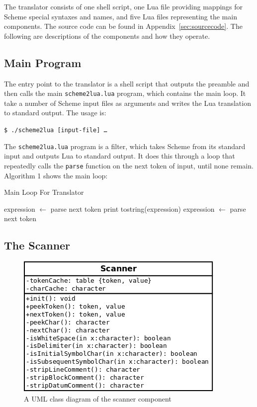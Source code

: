 The translator consists of one shell script, one Lua file providing mappings for
Scheme special syntaxes and names, and five Lua files representing the main
components. The source code can be found in Appendix~\ref{sec:sourcecode}. The
following are descriptions of the components and how they operate.

\subsection{Main Program}

The entry point to the translator is a shell script that outputs the preamble
and then calls the main \texttt{scheme2lua.lua} program, which contains the main
loop. It take a number of Scheme input files as arguments and writes the Lua
translation to standard output. The usage is:

\begin{framed}
\texttt{\$ ./scheme2lua [input-file] \ldots}
\end{framed}

The \texttt{scheme2lua.lua} program is a filter, which takes Scheme from its
standard input and outputs Lua to standard output. It does this through a loop
that repeatedly calls the \texttt{parse} function on the next token of input,
until none remain. Algorithm 1 shows the main loop:

\begin{algorithm}
\caption{Main Loop For Translator}
\label{alg:mainloop}
\begin{algorithmic}
\STATE expression $\leftarrow$ parse next token  
\STATE print tostring(expression)
\STATE expression $\leftarrow$ parse next token
\ENDWHILE
\end{algorithmic}
\end{algorithm}

\subsection{The Scanner}

\begin{figure}
\centering
\includegraphics[width=\textwidth]{scannerUML.png}
\caption{A UML class diagram of the scanner component}
\label{fig:scannerUML}
\end{figure}

